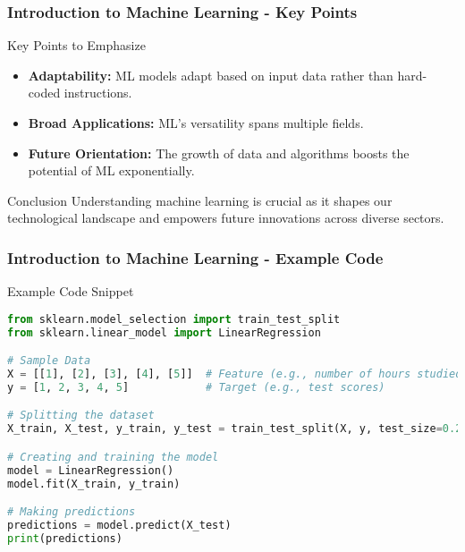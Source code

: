 \documentclass[aspectratio=169]{beamer}
\begin{document}
\begin{frame}[fragile]
    \frametitle{Introduction to Machine Learning - Key Points}
    \begin{block}{Key Points to Emphasize}
        \begin{itemize}
            \item \textbf{Adaptability:} ML models adapt based on input data rather than hard-coded instructions.
            \item \textbf{Broad Applications:} ML's versatility spans multiple fields.
            \item \textbf{Future Orientation:} The growth of data and algorithms boosts the potential of ML exponentially.
        \end{itemize}
    \end{block}
    
    \begin{block}{Conclusion}
        Understanding machine learning is crucial as it shapes our technological landscape and empowers future innovations across diverse sectors.
    \end{block}
\end{frame}

\begin{frame}[fragile]
    \frametitle{Introduction to Machine Learning - Example Code}
    \begin{block}{Example Code Snippet}
        \begin{lstlisting}[language=Python]
from sklearn.model_selection import train_test_split
from sklearn.linear_model import LinearRegression

# Sample Data
X = [[1], [2], [3], [4], [5]]  # Feature (e.g., number of hours studied)
y = [1, 2, 3, 4, 5]            # Target (e.g., test scores)

# Splitting the dataset
X_train, X_test, y_train, y_test = train_test_split(X, y, test_size=0.2)

# Creating and training the model
model = LinearRegression()
model.fit(X_train, y_train)

# Making predictions
predictions = model.predict(X_test)
print(predictions)
        \end{lstlisting}
    \end{block}
\end{frame}
\end{document}
